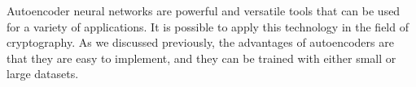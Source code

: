 
Autoencoder neural networks are powerful and versatile tools that can be used for a variety of applications. It is possible to apply this technology in the field of cryptography. As we discussed previously, the advantages of autoencoders are that they are easy to implement, and they can be trained with either small or large datasets.